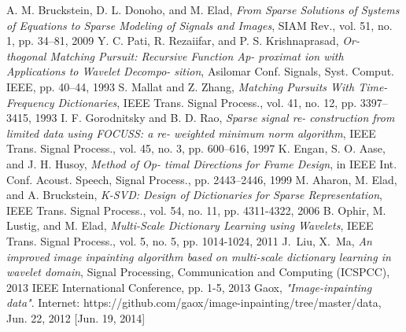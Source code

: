 \documentclass[conference]{IEEEtran}
\begin{document}
%
%
%
\begin{thebibliography}{1}
A. M. Bruckstein, D. L. Donoho, and M. Elad, \emph{From Sparse Solutions of Systems of Equations to Sparse Modeling of Signals and Images}, SIAM Rev., vol. 51, no. 1, pp. 34–81, 2009
 Y. C. Pati, R. Rezaiifar, and P. S. Krishnaprasad, \emph{Or- thogonal Matching Pursuit: Recursive Function Ap- proximat ion with Applications to Wavelet Decompo- sition}, Asilomar Conf. Signals, Syst. Comput. IEEE, pp. 40–44, 1993
 S. Mallat and Z. Zhang, \emph{Matching Pursuits With Time-Frequency Dictionaries}, IEEE Trans. Signal Process., vol. 41, no. 12, pp. 3397–3415, 1993
I. F. Gorodnitsky and B. D. Rao, \emph{Sparse signal re- construction from limited data using FOCUSS: a re- weighted minimum norm algorithm}, IEEE Trans. Signal Process., vol. 45, no. 3, pp. 600–616, 1997
 K. Engan, S. O. Aase, and J. H. Husoy, \emph{Method of Op- timal Directions for Frame Design}, in IEEE Int. Conf. Acoust. Speech, Signal Process., pp. 2443–2446, 1999
M. Aharon, M. Elad, and A. Bruckstein, \emph{K-SVD: Design of Dictionaries for Sparse Representation}, IEEE Trans. Signal Process., vol. 54, no. 11, pp. 4311-4322, 2006
B. Ophir, M. Lustig, and M. Elad, \emph{Multi-Scale Dictionary Learning using Wavelets}, IEEE Trans. Signal Process., vol. 5, no. 5, pp. 1014-1024, 2011
J.~Liu, X.~Ma, \emph{An improved image inpainting algorithm based on multi-scale dictionary learning in wavelet domain}, Signal Processing, Communication and Computing (ICSPCC), 2013 IEEE International Conference, pp. 1-5, 2013
Gaox, \emph{"Image-inpainting data"}. Internet: https://github.com/gaox/image-inpainting/tree/master/data, Jun. 22, 2012 [Jun. 19, 2014]

\end{thebibliography}


\end{document}
